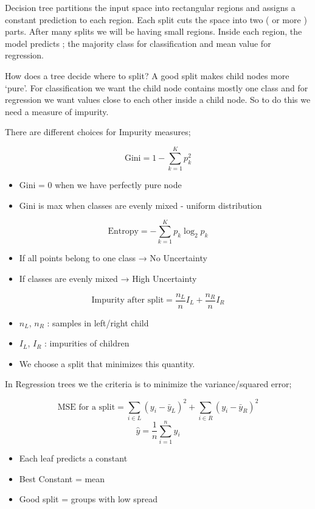 \documentclass[10pt,a4paper]{article}
\begin{document}
		Decision tree partitions the input space into rectangular regions and assigns a constant prediction to each region. Each split cuts the space into two ( or more ) parts. After many splits we will be having small regions. Inside each region, the model predicts ; the majority class for classification and mean value for regression.
	
		How does a tree decide where to split? A good split makes child nodes more ‘pure’. For classification we want the child node contains mostly one class and for regression we want values close to each other inside a child node. So to do this we need a measure of impurity.
	
		There are different choices for Impurity measures;
	
	
		$$		\text{Gini} = 1 - \sum_{k=1}^{K}p_k^2
		$$
		\begin{itemize}
			\item Gini = 0 when we have perfectly pure node
			\item Gini is max when classes are evenly mixed - uniform distribution
		\end{itemize}
	
	
		$$		\text{Entropy} = - \sum_{k=1}^{K} p_k \log_2 p_k
		$$
	
		\begin{itemize}
			\item If all points belong to one class → No Uncertainty
			\item If classes are evenly mixed → High Uncertainty
		\end{itemize}
	
	
		$$		\text{Impurity after split} = \frac{n_L}{n} I_L + \frac{n_R}{n} I_R
		$$
	
		\begin{itemize}
			\item $n_L$, $n_R$ : samples in left/right child
			\item $I_L$, $I_R$ : impurities of children
			\item We choose a split that minimizes this quantity.
		\end{itemize}
	
		In Regression trees we the criteria is to minimize the variance/squared error;
	
	
		$$		\text{MSE for a split} = \sum_{i \in L}(y_i - \bar{y}_L)^2 +\sum_{i \in R}(y_i - \bar{y}_R)^2
		$$
		$$		\hat{y} = \frac{1}{n} \sum_{i=1}^{n} y_i
		$$
	
		\begin{itemize}
			\item Each leaf predicts a constant
			\item Best Constant = mean
			\item Good split = groups with low spread
		\end{itemize}
	
\end{document}
